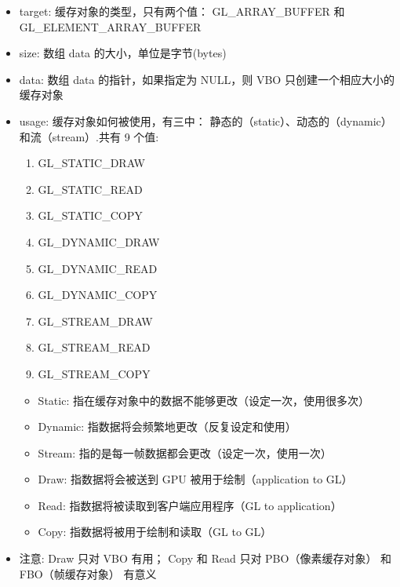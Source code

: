 \documentclass[UTF8,a4paper,8pt]{ctexart}
\begin{document}
				\begin{itemize}
					\item target: 缓存对象的类型，只有两个值： GL\_ARRAY\_BUFFER 和 GL\_ELEMENT\_ARRAY\_BUFFER
					
					\item size: 数组 data 的大小，单位是字节(bytes)
					\item data: 数组 data 的指针，如果指定为 NULL，则 VBO 只创建一个相应大小的缓存对象
					\item usage: 缓存对象如何被使用，有三中： 静态的（static）、动态的（dynamic）和流（stream）.共有 9 个值:
						\begin{enumerate}
							\item GL\_STATIC\_DRAW
							\item GL\_STATIC\_READ
							\item GL\_STATIC\_COPY
							\item GL\_DYNAMIC\_DRAW
							\item GL\_DYNAMIC\_READ
							\item GL\_DYNAMIC\_COPY
							\item GL\_STREAM\_DRAW
							\item GL\_STREAM\_READ
							\item GL\_STREAM\_COPY
						\end{enumerate}
						
						\begin{itemize}
							\item Static: 指在缓存对象中的数据不能够更改（设定一次，使用很多次）
							\item Dynamic: 指数据将会频繁地更改（反复设定和使用）
							\item Stream: 指的是每一帧数据都会更改（设定一次，使用一次）
						\end{itemize}
						
						\begin{itemize}
							\item Draw: 指数据将会被送到 GPU 被用于绘制（application to GL）
							\item Read: 指数据将被读取到客户端应用程序（GL to application）
							\item Copy: 指数据将被用于绘制和读取（GL to GL）
						\end{itemize}
					\item 注意: Draw 只对 VBO 有用； Copy 和 Read 只对 PBO（像素缓存对象） 和 FBO（帧缓存对象） 有意义
				\end{itemize}
			
\end{document}
